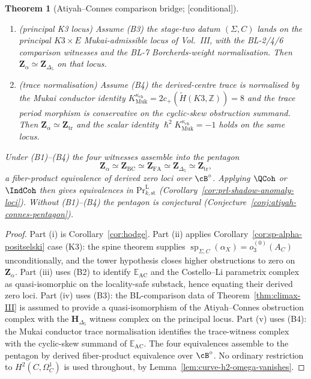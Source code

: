 \documentclass[11pt,reqno]{amsart}
\theoremstyle{plain}
\newtheorem{theorem}{Theorem}[section]
\theoremstyle{definition}
\theoremstyle{remark}
\providecommand{\ClaimStatusConditional}{\textnormal{[conditional]}}
\newcommand{\Zbb}{\mathbb{Z}}
\newcommand{\hbar}{{\hslash}}
\begin{document}
\begin{theorem}[Atiyah--Connes comparison bridge; \ClaimStatusConditional]
\begin{enumerate}[label=\textup{(\roman*)}]
  \item \textup{(principal K3 locus)} Assume \textup{(B3)} the
  stage-two datum $(\Sigma,C)$ lands on the principal $K3\times E$
  Mukai-admissible locus of Vol.~III, with the BL-2/4/6 comparison
  witnesses and the BL-7 Borcherds-weight normalisation. Then
  $\mathbf Z_\alpha\simeq\mathbf Z_{\Delta_5}$ on that locus.

  \item \textup{(trace normalisation)} Assume \textup{(B4)} the
  derived-centre trace is normalised by the Mukai conductor identity
  $K^{\kappa_{\mathrm{ch}}}_{\mathrm{Muk}}
  =2c_+(\widetilde H(K3,\Zbb))=8$ and the trace period morphism is
  conservative on the cyclic-skew obstruction summand. Then
  $\mathbf Z_\alpha\simeq\mathbf Z_{\mathrm{tr}}$ and the scalar
  identity $\hbar^2K^{\kappa_{\mathrm{ch}}}_{\mathrm{Muk}}=-1$ holds on
  the same locus.
\end{enumerate}
Under \textup{(B1)--(B4)} the four witnesses assemble into the
pentagon
\[
  \mathbf Z_\alpha
  \simeq\mathbf Z_{\mathrm{BC}}
  \simeq\mathbf Z_{\mathrm{FA}}
  \simeq\mathbf Z_{\Delta_5}
  \simeq\mathbf Z_{\mathrm{tr}},
\]
a fiber-product equivalence of derived zero loci over $\cB^\circ$.
Applying $\QCoh$ or $\IndCoh$ then gives equivalences in
$\mathrm{Pr}^{\mathrm L}_{k,\mathrm{st}}$
(Corollary~\ref{cor:prl-shadow-anomaly-loci}). Without
\textup{(B1)--(B4)} the pentagon is conjectural
(Conjecture~\ref{conj:atiyah-connes-pentagon}).
\end{theorem}

\begin{proof}
Part (i) is Corollary~\ref{cor:hodge}. Part (ii) applies
Corollary~\ref{cor:sp-alpha-positselski} case \textup{(K3)}: the spine
theorem supplies
$\operatorname{sp}_{\Sigma,C}(\alpha_X)=o^{(0)}_3(A_C)$
unconditionally, and the tower hypothesis closes higher obstructions
to zero on $\mathbf Z_\alpha$. Part (iii) uses \textup{(B2)} to
identify $\mathbb E_{\mathrm{AC}}$ and the Costello--Li parametrix
complex as quasi-isomorphic on the locality-safe substack, hence
equating their derived zero loci. Part (iv) uses \textup{(B3)}: the
BL-comparison data of Theorem~\ref{thm:climax-III} is assumed to
provide a quasi-isomorphism of the Atiyah--Connes obstruction complex
with the $\mathbf H_{\Delta_5}$ witness complex on the principal locus. Part
(v) uses \textup{(B4)}: the Mukai conductor trace normalisation
identifies the trace-witness complex with the cyclic-skew summand of
$\mathbb E_{\mathrm{AC}}$. The four equivalences assemble to the
pentagon by derived fiber-product equivalence over $\cB^\circ$. No
ordinary restriction to $H^2(C,\Omega^1_C)$ is used throughout, by
Lemma~\ref{lem:curve-h2-omega-vanishes}.
\end{proof}
\end{document}
